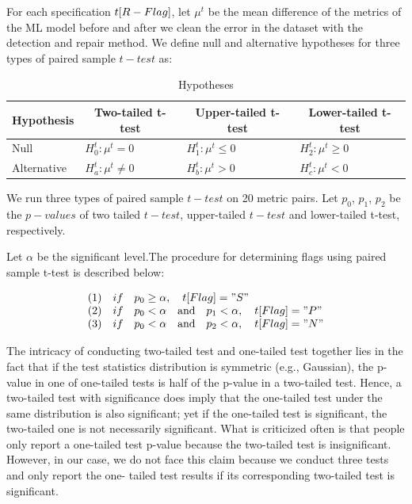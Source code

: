 For each specification $t[R\--Flag]$, let $\mu^{t}$ be the mean difference
of the metrics of the ML model before and after we clean the error
in the dataset with the detection and repair method. We define null
and alternative hypotheses for three types of paired sample $t-test$
as:

\begin{table}[H]
	\centering
	\begin{tabular}{|l|l|l|l|}
		\hline
		\multicolumn{1}{|c|}{\textbf{Hypothesis}} & \multicolumn{1}{c|}{\textbf{Two-tailed t-test}} & \multicolumn{1}{c|}{\textbf{Upper-tailed t-test}} & \multicolumn{1}{c|}{\textbf{Lower-tailed t-test}} \\ \hline
	Null &  $ H^{t}_{0}:\mu^{t} = 0 $ & $H^{t}_{1}:\mu^{t} \leq 0$  & $H^{t}_{2}:\mu^{t} \geq 0$  \\ \hline
		Alternative &  $ H^{t}_{a}:\mu^{t} \neq 0 $ & $H^{t}_{b}:\mu^{t} > 0$  & $H^{t}_{c}:\mu^{t} < 0$  \\ \hline
	\end{tabular}
	\caption{Hypotheses}
	\label{tab:hypotheses}
\end{table}

We run three types of paired sample $t-test$ on 20 metric pairs. Let $p_{0}$,
$p_{1}$, $p_{2}$ be the $p-values$ of two tailed $t-test$, upper-tailed $t-test$ and
lower-tailed t-test, respectively. 

Let $\alpha$ be the significant level.The procedure for determining flags using paired sample t-test is
described below:
	

\begin{equation*}
\begin{array}{l}
   (1) \quad if \quad p_{0} \geq \alpha,\quad t[Flag] = "S" \\
   (2) \quad if \quad p_{0} < \alpha \quad \textrm{and} \quad p_{1} < \alpha, \quad t[Flag] = "P" \\
   (3) \quad if \quad p_{0} < \alpha \quad \textrm{and} \quad p_{2} < \alpha,  \quad t[Flag] = "N" \\
 \end{array}
\end{equation*}

The intricacy of conducting two-tailed test and one-tailed test
together lies in the fact that if the test statistics distribution is symmetric 
(e.g., Gaussian), the p-value in one of one-tailed tests is half
of the p-value in a two-tailed test. Hence, a two-tailed test with
significance does imply that the one-tailed test under the same distribution is also significant; yet if the one-tailed test is significant,
the two-tailed one is not necessarily significant. What is criticized
often is that people only report a one-tailed test p-value because the
two-tailed test is insignificant. However, in our case, we do not face
this claim because we conduct three tests and only report the one-
tailed test results if its corresponding two-tailed test is significant.


